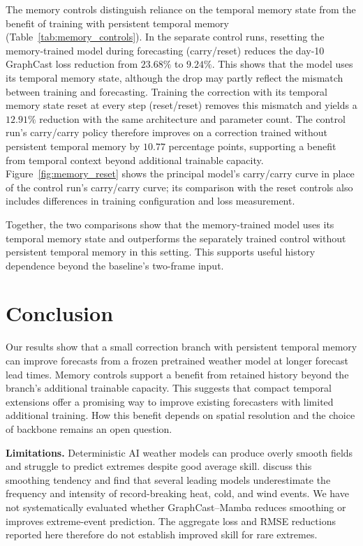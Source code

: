 \documentclass{article}
\begin{document}
The memory controls distinguish reliance on the temporal memory state from the benefit of training with persistent temporal memory (Table~\ref{tab:memory_controls}). In the separate control runs, resetting the memory-trained model during forecasting (carry/reset) reduces the day-10 {GraphCast loss} reduction from {$23.68\%$} to $9.24\%$. This shows that the model uses its temporal memory state, although the drop may partly reflect the mismatch between training and forecasting. Training the correction with its temporal memory state reset at every step (reset/reset) removes this mismatch and yields a $12.91\%$ reduction with the same architecture and parameter count. The control run's carry/carry policy therefore improves on a correction trained without persistent temporal memory by {$10.77$} percentage points, supporting a benefit from temporal context beyond additional trainable capacity. Figure~\ref{fig:memory_reset} shows the principal model's {carry/carry curve in place of the control run's carry/carry curve}; its comparison with the reset controls also includes differences in training configuration and loss measurement.

Together, the two comparisons show that the memory-trained model uses its temporal memory state and outperforms the separately trained control without persistent temporal memory in this setting. This supports useful history dependence beyond the baseline's two-frame input.

\section{Conclusion}

Our results show that a small correction branch with persistent temporal memory can improve forecasts from a frozen pretrained weather model at longer forecast lead times. Memory controls support a benefit from retained history beyond the branch’s additional trainable capacity. This suggests that compact temporal extensions offer a promising way to improve existing forecasters with limited additional training. How this benefit depends on spatial resolution and the choice of backbone remains an open question.

{\textbf{Limitations.} Deterministic AI weather models can produce overly smooth fields and struggle to predict extremes despite good average skill. \citet{zhang2025numerical} discuss this smoothing tendency and find that several leading models underestimate the frequency and intensity of record-breaking heat, cold, and wind events. We have not systematically evaluated whether GraphCast--Mamba reduces smoothing or improves extreme-event prediction. The aggregate loss and RMSE reductions reported here therefore do not establish improved skill for rare extremes.}
\FloatBarrier
\end{document}
